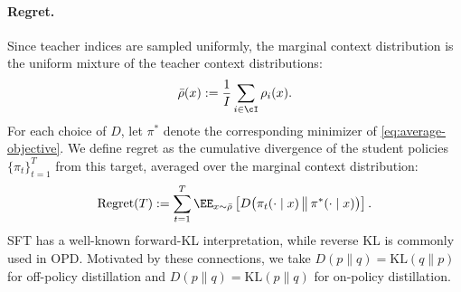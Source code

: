 \documentclass[11pt]{article}
\newcommand{\KL}{\text{KL}}
\begin{document}
\paragraph{Regret.} Since teacher indices are sampled uniformly, the marginal context distribution is the uniform mixture of the teacher context distributions:
\begin{align*}
    \bar{\rho}(x)
    :=
    \frac{1}{I}\sum_{i\in\cI}\rho_i(x).
\end{align*}
For each choice of $D$, let $\pi^*$ denote the corresponding minimizer of
\eqref{eq:average-objective}. We define regret as the cumulative divergence of the student policies $\{\pi_t\}_{t=1}^T$ from this target, averaged over the marginal context distribution:
\begin{align}
    \operatorname{Regret}(T)
    :=
    \sum_{t=1}^T
    \EE_{x\sim\bar{\rho}}
    \left[
        D\bigl(
            \pi_t(\cdot\mid x)
            \,\big\|\,
            \pi^*(\cdot\mid x)
        \bigr)
    \right].
    \label{eq:regret}
\end{align}
SFT has a well-known forward-KL interpretation, while reverse KL is commonly used in OPD. Motivated by these connections, we take $D(p\|q)=\KL(q\|p)$ for off-policy distillation and $D(p\|q)=\KL(p\|q)$ for on-policy distillation.

\end{document}
